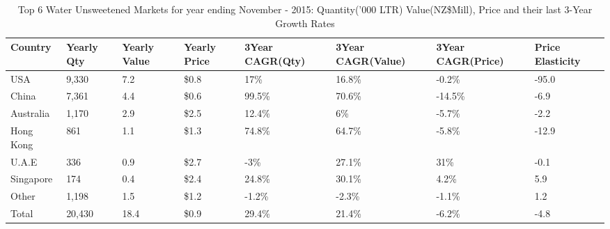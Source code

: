 \begin{table}[ht]
\centering
{\scriptsize
\begin{tabular}[t]{p{1.8cm}>{\hfill}p{1.4cm}>{\hfill}p{1.4cm}>{\hfill}p{1.6cm}>{\hfill}p{1.9cm}>{\hfill}p{2cm}>{\hfill}p{1.9cm}>{\hfill}p{1.5cm}}
 \textbf{Country} & \textbf{Yearly Qty} & \textbf{Yearly Value} & \textbf{Yearly Price} & \textbf{3Year CAGR(Qty)} & \textbf{3Year CAGR(Value)} & \textbf{3Year CAGR(Price)} & \textbf{Price Elasticity} \\
\hline
USA & 9,330 & 7.2 & \$0.8 & 17\% & 16.8\% & -0.2\% & -95.0 \\  
China & 7,361 & 4.4 & \$0.6 & 99.5\% & 70.6\% & -14.5\% & -6.9 \\  
Australia & 1,170 & 2.9 & \$2.5 & 12.4\% & 6\% & -5.7\% & -2.2 \\  
Hong Kong & 861 & 1.1 & \$1.3 & 74.8\% & 64.7\% & -5.8\% & -12.9 \\  
U.A.E & 336 & 0.9 & \$2.7 & -3\% & 27.1\% & 31\% & -0.1 \\  
Singapore & 174 & 0.4 & \$2.4 & 24.8\% & 30.1\% & 4.2\% & 5.9 \\  
Other & 1,198 & 1.5 & \$1.2 & -1.2\% & -2.3\% & -1.1\% & 1.2 \\  
Total & 20,430 & 18.4 & \$0.9 & 29.4\% & 21.4\% & -6.2\% & -4.8 \\  
\hline
\end{tabular}
}
\caption{\scriptsize Top 6 Water Unsweetened Markets for year ending November - 2015: Quantity('000 LTR) Value(NZ\$Mill), Price and their last 3-Year Growth Rates}
\end{table}

